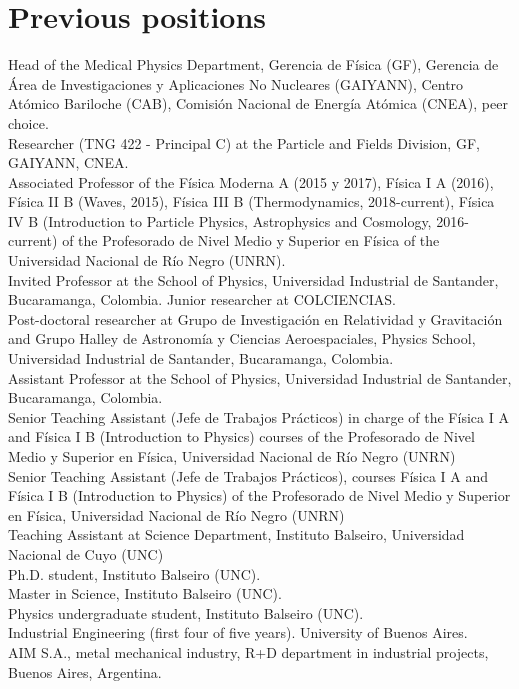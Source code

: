 \vspace{-1cm}
\ifres
\else
\ifeng
\section*{Previous positions}
\noindent
{} Head of the Medical Physics Department, Gerencia de Física (GF), Gerencia de Área de Investigaciones y Aplicaciones No Nucleares (GAIYANN), Centro Atómico Bariloche (CAB), Comisión Nacional de Energía Atómica (CNEA), peer choice.\\
 Researcher (TNG 422 - Principal C) at the Particle and Fields Division, GF, GAIYANN, CNEA.\\
 Associated Professor of the Física Moderna A (2015 y 2017), Física I A (2016), Física II B (Waves, 2015), Física III B (Thermodynamics, 2018-current), Física IV B (Introduction to Particle Physics, Astrophysics and Cosmology, 2016-current) of the Profesorado de Nivel Medio y Superior en Física of the Universidad Nacional de Río Negro (UNRN).\\
 Invited Professor at the School of Physics, Universidad Industrial de Santander, Bucaramanga, Colombia. Junior researcher at COLCIENCIAS.\\
 Post-doctoral researcher at Grupo de Investigación en Relatividad y Gravitación and Grupo Halley de Astronomía y Ciencias Aeroespaciales, Physics School, Universidad Industrial de Santander, Bucaramanga, Colombia.\\
 Assistant Professor at the School of Physics, Universidad Industrial de Santander, Bucaramanga, Colombia.\\
 Senior Teaching Assistant (Jefe de Trabajos Prácticos) in charge of the Física I A and Física I B (Introduction to Physics) courses of the Profesorado de Nivel Medio y Superior en Física, Universidad Nacional de Río Negro (UNRN)\\
 Senior Teaching Assistant (Jefe de Trabajos Prácticos), courses Física I A and Física I B (Introduction to Physics) of the Profesorado de Nivel Medio y Superior en Física, Universidad Nacional de Río Negro (UNRN)\\
 Teaching Assistant at Science Department, Instituto Balseiro, Universidad Nacional de Cuyo (UNC)\\
 Ph.D. student, Instituto Balseiro (UNC).\\
 Master in Science, Instituto Balseiro (UNC).\\
 Physics undergraduate student, Instituto Balseiro (UNC).\\
 Industrial Engineering (first four of five years). University of Buenos Aires.\\
 AIM S.A., metal mechanical industry, R+D department in industrial projects, Buenos Aires, Argentina.\\
\else
